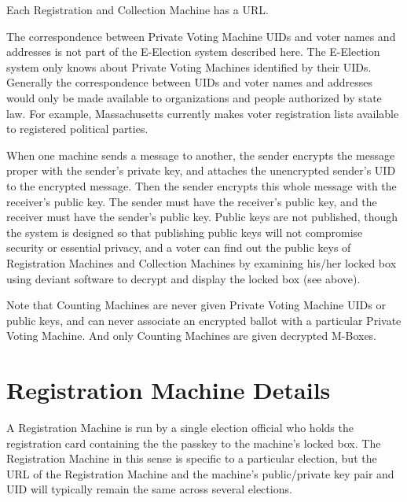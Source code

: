 \documentclass[12pt]{article}
\begin{document}
Each Registration and Collection Machine has a URL.

The correspondence between Private Voting Machine UIDs
and voter names and addresses is not part of the E-Election system
described here.  The E-Election system only knows about
Private Voting Machines identified by their UIDs.
Generally the correspondence between UIDs and voter names and addresses
would only be made available
to organizations and people authorized by state law.
For example, Massachusetts currently makes voter registration lists
available to registered political parties.

When one machine sends a message to another, the sender
encrypts the message proper with the sender's private
key, and attaches the unencrypted sender's UID to the
encrypted message.  Then the sender encrypts this whole message with the
receiver's public key.  The sender must have the receiver's
public key, and the receiver must have the sender's public
key.  Public keys are not published,
though the system is designed so that publishing public
keys will not compromise security or essential privacy,
and a voter can find out the public keys of Registration
Machines and Collection Machines by examining his/her locked
box using deviant software to decrypt and
display the locked box (see \pageref{DEVIANT-SOFTWARE} above).

Note that Counting Machines are never given Private Voting
Machine UIDs or public keys, and can never associate an
encrypted ballot with a particular Private Voting Machine.
And only Counting Machines are given decrypted M-Boxes.

\section{Registration Machine Details}

A Registration Machine is run by a single election official
who holds the registration card containing the the passkey to
the machine's locked box.  The Registration Machine in this
sense is specific to a particular election, but the
URL of the Registration Machine and the machine's
public/private key pair and UID will typically remain the same across
several elections.
\end{document}
